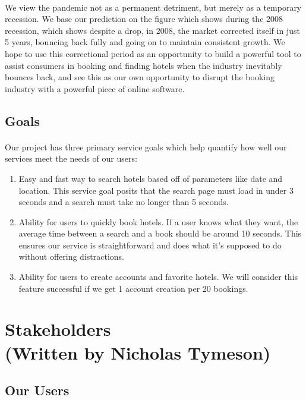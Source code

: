 \documentclass[]{article}
\begin{document}
\paragraph{}
We view the pandemic not as a permanent detriment, but merely as a temporary recession. We base our prediction on the figure which shows during the 2008 recession, which shows despite a drop, in 2008, the market corrected itself in just 5 years, bouncing back fully and going on to maintain consistent growth. We hope to use this correctional period as an opportunity to build a powerful tool to assist consumers in booking and finding hotels when the industry inevitably bounces back, and see this as our own opportunity to disrupt the booking industry with a powerful piece of online software. 

\subsection{Goals}
\paragraph{}
Our project has three primary service goals which help quantify how well our services meet the needs of our users:
\begin{enumerate}
    \item Easy and fast way to search hotels based off of parameters like date and location. This service goal posits that the search page must load in under 3 seconds and a search must take no longer than 5 seconds. 
    \item Ability for users to quickly book hotels. If a user knows what they want, the average time between a search and a book should be around 10 seconds. This ensures our service is straightforward and does what it's supposed to do without offering distractions.
    \item Ability for users to create accounts and favorite hotels. We will consider this feature successful if we get 1 account creation per 20 bookings. 
\end{enumerate}

\section{Stakeholders \\(Written by Nicholas Tymeson)}
\subsection{Our Users}
\end{document}
